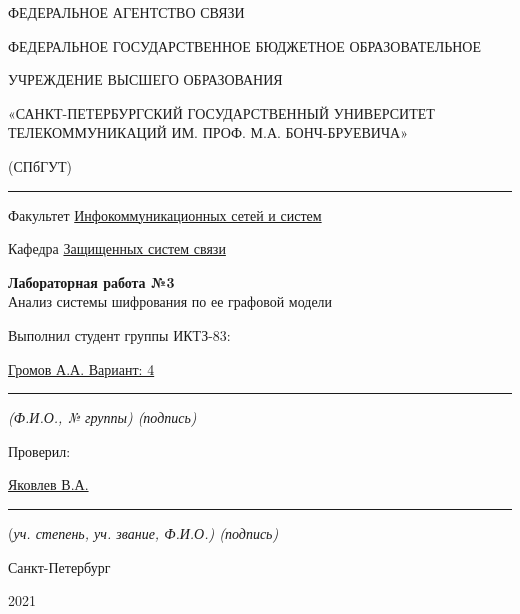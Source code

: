 \documentclass[a4paper,14pt]{extarticle}
\begin{document}
    \begin{center}
        \thispagestyle{empty}
        \begin{singlespace}
        ФЕДЕРАЛЬНОЕ АГЕНТСТВО СВЯЗИ

        ФЕДЕРАЛЬНОЕ ГОСУДАРСТВЕННОЕ БЮДЖЕТНОЕ ОБРАЗОВАТЕЛЬНОЕ

        УЧРЕЖДЕНИЕ ВЫСШЕГО ОБРАЗОВАНИЯ

        «САНКТ-ПЕТЕРБУРГСКИЙ ГОСУДАРСТВЕННЫЙ УНИВЕРСИТЕТ ТЕЛЕКОММУНИКАЦИЙ ИМ. ПРОФ. М.А. БОНЧ-БРУЕВИЧА»

        (СПбГУТ)
        \end{singlespace}
        \vspace{-1ex}
        \rule{\textwidth}{0.4pt}
        \vspace{-5ex}

        Факультет \underline{Инфокоммуникационных сетей и систем}

        Кафедра \underline{Защищенных систем связи}
        \vspace{10ex}

        \textbf{Лабораторная работа №3}\\
        Анализ системы шифрования по ее графовой модели


    \end{center}
    \vspace{4ex}
    \begin{flushright}
    \parbox{10 cm}{
    \begin{flushleft}
        Выполнил студент группы ИКТЗ-83:

        \underline{Громов А.А. Вариант: 4} \hfill \rule[-0.85ex]{0.1\textwidth}{0.6pt}

        \footnotesize \textit{ (Ф.И.О., № группы) \hfill (подпись)} \normalsize

        Проверил:

        \underline{Яковлев В.А.} \hfill \rule[-0.85ex]{0.1\textwidth}{0.6pt}

        (\footnotesize \textit{уч. степень, уч. звание, Ф.И.О.) \hfill (подпись)} \normalsize

    \end{flushleft}
    }
    \end{flushright}
    \begin{center}
        \vfill
        Санкт-Петербург

        2021

    \end{center}
    \newpage
\end{document}
